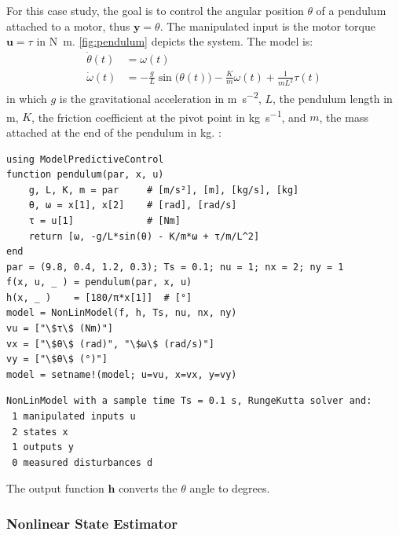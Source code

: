 For this case study, the goal is to control the angular position $\theta$ of a pendulum attached to a motor, thus $\mathbf{y} = \theta$. The manipulated input is the motor torque $\mathbf{u} = \tau$ in \si{\newton\meter}. \cref{fig:pendulum} depicts the system. The model is:
\begin{subequations}
\begin{align}
\dot{\theta}(t) &= \omega(t) \\
\dot{\omega}(t) &= -\frac{g}{L}\sin\big(\theta(t)\big) -\frac{K}{m}\omega(t) + \frac{1}{m L^2}\tau(t) \label{eq.pendulum_speed}
\end{align}
\end{subequations}
in which $g$ is the gravitational acceleration in \si{\meter\per\second\squared}, $L$, the pendulum length in \si{\meter}, $K$, the friction coefficient at the pivot point in \si{\kilogram\per\second}, and $m$, the mass attached at the end of the pendulum in \si{\kilogram}. :
\vspace*{-5pt}
\begin{verbatim}
using ModelPredictiveControl
function pendulum(par, x, u)
    g, L, K, m = par     # [m/s²], [m], [kg/s], [kg]
    θ, ω = x[1], x[2]    # [rad], [rad/s]
    τ = u[1]             # [Nm]
    return [ω, -g/L*sin(θ) - K/m*ω + τ/m/L^2]
end
par = (9.8, 0.4, 1.2, 0.3); Ts = 0.1; nu = 1; nx = 2; ny = 1
f(x, u, _ ) = pendulum(par, x, u)
h(x, _ )    = [180/π*x[1]]  # [°]
model = NonLinModel(f, h, Ts, nu, nx, ny)
vu = ["\$τ\$ (Nm)"]
vx = ["\$θ\$ (rad)", "\$ω\$ (rad/s)"]
vy = ["\$θ\$ (°)"]
model = setname!(model; u=vu, x=vx, y=vy)
\end{verbatim}
\spacerepl
\begin{verbatim}
NonLinModel with a sample time Ts = 0.1 s, RungeKutta solver and:
 1 manipulated inputs u
 2 states x
 1 outputs y
 0 measured disturbances d
\end{verbatim}

The output function $\mathbf{h}$ converts the $\theta$ angle to degrees.

\subsubsection{Nonlinear State Estimator}

